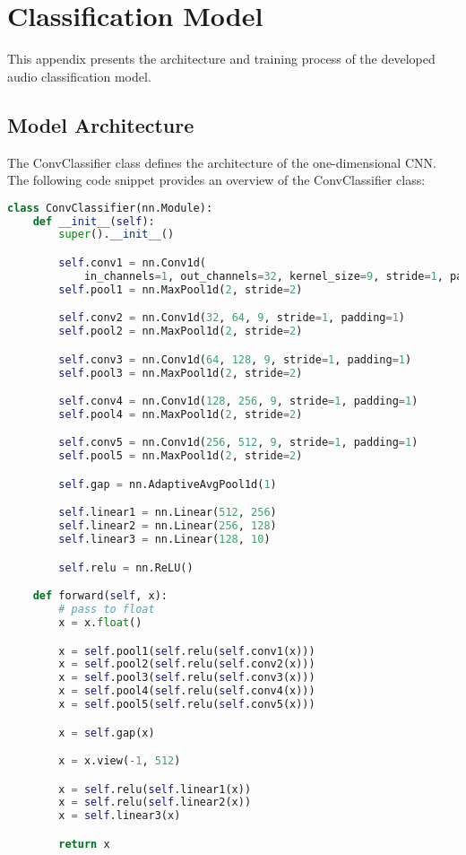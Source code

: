 \chapter{Classification Model} \label{ann:classification}


This appendix presents the architecture and training process of the developed audio classification model.

\section{Model Architecture}

The ConvClassifier class defines the architecture of the one-dimensional \ac{CNN}. The following code snippet provides an overview of the ConvClassifier class:

\begin{lstlisting}[language=Python, caption={ConvClassifier class for sound classification}]
class ConvClassifier(nn.Module):
    def __init__(self):
        super().__init__()

        self.conv1 = nn.Conv1d(
            in_channels=1, out_channels=32, kernel_size=9, stride=1, padding=1)
        self.pool1 = nn.MaxPool1d(2, stride=2)

        self.conv2 = nn.Conv1d(32, 64, 9, stride=1, padding=1)
        self.pool2 = nn.MaxPool1d(2, stride=2)

        self.conv3 = nn.Conv1d(64, 128, 9, stride=1, padding=1)
        self.pool3 = nn.MaxPool1d(2, stride=2)

        self.conv4 = nn.Conv1d(128, 256, 9, stride=1, padding=1)
        self.pool4 = nn.MaxPool1d(2, stride=2)

        self.conv5 = nn.Conv1d(256, 512, 9, stride=1, padding=1)
        self.pool5 = nn.MaxPool1d(2, stride=2)

        self.gap = nn.AdaptiveAvgPool1d(1)

        self.linear1 = nn.Linear(512, 256)
        self.linear2 = nn.Linear(256, 128)
        self.linear3 = nn.Linear(128, 10)

        self.relu = nn.ReLU()

    def forward(self, x):
        # pass to float
        x = x.float()

        x = self.pool1(self.relu(self.conv1(x)))
        x = self.pool2(self.relu(self.conv2(x)))
        x = self.pool3(self.relu(self.conv3(x)))
        x = self.pool4(self.relu(self.conv4(x)))
        x = self.pool5(self.relu(self.conv5(x)))

        x = self.gap(x)

        x = x.view(-1, 512)

        x = self.relu(self.linear1(x))
        x = self.relu(self.linear2(x))
        x = self.linear3(x)

        return x
\end{lstlisting}

